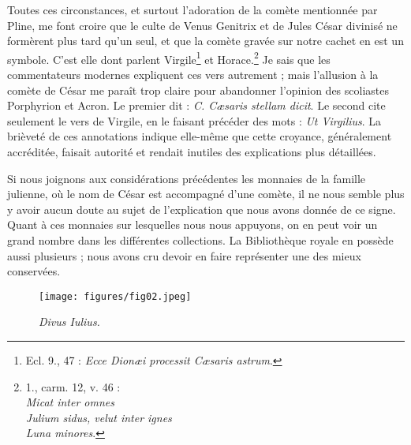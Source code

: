 \documentclass[a4paper, 11pt, oneside, polutonikogreek, french]{article}
\begin{document}
Toutes ces circonstances, et surtout l'adoration de la comète mentionnée par Pline, me font croire que le culte de Venus Genitrix et de Jules César divinisé ne formèrent plus tard qu'un seul, et que la comète gravée sur notre cachet en est un symbole. C'est elle dont parlent Virgile\footnote{Ecl. 9., 47 : \emph{Ecce Dionæi processit Cæsaris astrum}.} et Horace.\footnote{1., carm. 12, v. 46 :\\\hspace*{10mm}\emph{Micat inter omnes}\\\hspace*{10mm}\emph{Julium sidus, velut inter ignes}\\\hspace*{10mm}\emph{Luna minores}.} Je sais que les commentateurs modernes expliquent ces vers autrement ; mais l'allusion à la comète de César me paraît trop claire pour abandonner l'opinion des scoliastes Porphyrion et Acron. Le premier dit : \emph{C. Cæsaris stellam dicit}. Le second cite seulement le vers de Virgile, en le faisant précéder des mots : \emph{Ut Virgilius}. La brièveté de ces annotations indique elle-même que cette croyance, généralement accréditée, faisait autorité et rendait inutiles des explications plus détaillées.

Si nous joignons aux considérations précédentes les monnaies de la famille julienne, où le nom de César est accompagné d'une comète, il ne nous semble plus y avoir aucun doute au sujet de l'explication que nous avons donnée de ce signe. Quant à ces monnaies sur lesquelles nous nous appuyons, on en peut voir un grand nombre dans les différentes collections. La Bibliothèque royale en possède aussi plusieurs ; nous avons cru devoir en faire représenter une des mieux conservées.

\begin{figure}[H]
\centering
\texttt{[image: figures/fig02.jpeg]}
\caption{\emph{Divus Iulius.}}
\end{figure}
\end{document}

